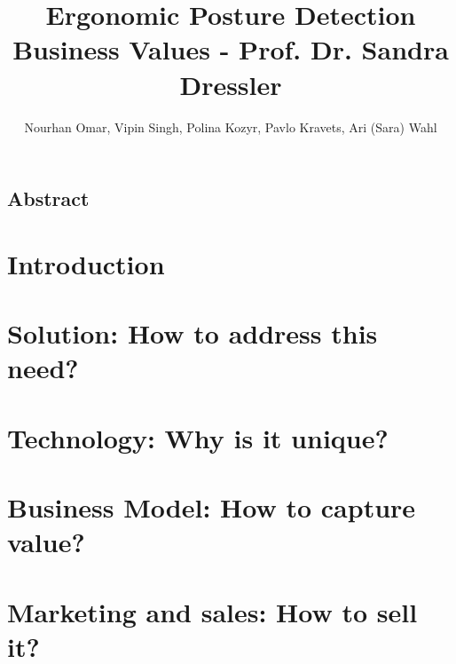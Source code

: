 \documentclass[a4paper, 11pt]{report}
\title{
    {\Huge Ergonomic Posture Detection}\\
    {\large Business Values - Prof. Dr. Sandra Dressler}
}
\author{Nourhan Omar, Vipin Singh, Polina Kozyr, Pavlo Kravets, Ari (Sara) Wahl}
\date{
    \begin{figure}[h]
        \texttt{[image: cover\_image.png]}
    \end{figure}
}
\begin{document}
    

	{
		\FloatBarrier
		\newpage
        \setcounter{page}{2}
		\thispagestyle{plain}
		\vspace*{\fill}
			\section*{{\Large Abstract}}
			
		\vspace*{\fill}
	}

    {
        \FloatBarrier
        \newpage
        \tableofcontents
    }

	{
		\FloatBarrier
		\chapter{Introduction}
		\label{chp:introduction}
		
	}

	{
		\FloatBarrier
		\chapter{Solution: How to address this need?}
		\label{chp:solution}
		
	}

	{
		\FloatBarrier
		\chapter{Technology: Why is it unique?}
		\label{chp:technology}
		
	}

	{
		\FloatBarrier
		\chapter{Business Model: How to capture value?}
		\label{chp:business_model}
		
	}

	{
		\FloatBarrier
		\chapter{Marketing and sales: How to sell it?}
		\label{chp:marketing}
		
	}
\end{document}

